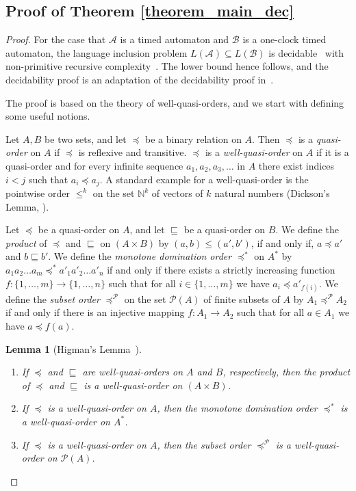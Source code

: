 \documentclass{CSML}
\theoremstyle{plain}\newtheorem{theorem}[thm]{Theorem}
\theoremstyle{plain}\newtheorem{corollary}[thm]{Corollary}
\theoremstyle{plain}\newtheorem{example}[thm]{Example}
\theoremstyle{plain}\newtheorem{lemma}[thm]{Lemma}
\theoremstyle{plain}\newtheorem{remark}[thm]{Remark}
\newcommand{\N}{\mathbb{N}}
\newcommand{\B}{\mathcal{B}}
\newcommand{\A}{\mathcal{A}}
\begin{document}
	\subsection{Proof of Theorem \ref{theorem_main_dec}}
	\begin{proof}
		For the case that $\A$ is a timed automaton and $\B$ is a one-clock timed automaton,
		the language inclusion problem $L(\A)\subseteq L(\B)$ is decidable~\cite{DBLP:conf/lics/OuaknineW04} with non-primitive recursive complexity~\cite{DBLP:journals/fuin/AbdullaDOQW08}. 
		The lower bound hence follows, and the decidability proof is an adaptation of the decidability proof in~\cite{DBLP:conf/lics/OuaknineW04}.


		
		The proof is based on the theory of well-quasi-orders, and we start with defining some useful notions.
	
	Let $A,B$ be two sets, and let $\preceq$ be a binary relation on $A$.
	Then $\preceq$ is a \emph{quasi-order} on $A$ if $\preceq$ is reflexive and transitive. 
	$\preceq$ is a \emph{well-quasi-order} on $A$ if it is a quasi-order and for every infinite sequence $a_1,a_2,a_3,\dots$ in $A$ there exist indices $i<j$ such that $a_i\preceq a_j$. 
	A standard example for a well-quasi-order is the pointwise order $\leq^k$ on the set $\N^k$ of vectors of $k$ natural numbers (Dickson's Lemma, \cite{Dickson1913}). 
	
	Let $\preceq$ be a quasi-order on $A$, 
	and let $\sqsubseteq$ be a quasi-order on $B$. 
	We define the \emph{product} of $\preceq$ and $\sqsubseteq$ on $(A\times B)$ by $(a,b)\leq (a',b')$, if and only if, $a\preceq a'$ and $b \sqsubseteq b'$. 	
	We define the \emph{monotone domination order} $\preceq^*$ on $A^*$ by $a_1 a_2 \dots a_m \preceq^* a'_1 a'_2\dots a'_n$ if and only if there exists a strictly increasing function ${f:\{1,\dots,m\}\to\{1,\dots,n\}}$ such that for all $i\in\{1,\dots,m\}$ we have $a_i\preceq a'_{f(i)}$. 
	We define the \emph{subset order} $\preceq^\mathcal{P}$ on the set $\mathcal{P}(A)$ of finite subsets of $A$ by
	$A_1\preceq^\mathcal{P} A_2$ if and only if there is an injective mapping $f:A_1\to A_2$ such that for all $a\in A_1$ we have $a\preceq f(a)$. 
	


	\begin{lemma}[Higman's Lemma~\cite{Higman1952}]
		\label{lemma_higman}
		\begin{enumerate}
		\item If $\preceq$ and $\sqsubseteq$ are well-quasi-orders on $A$ and $B$, respectively, 
			then the product of $\preceq$ and $\sqsubseteq$ is a well-quasi-order on $(A\times B)$. 
	\item  If $\preceq$ is a well-quasi-order on $A$,
		then the monotone domination order $\preceq^*$ is a well-quasi-order on $A^*$. 
	\item  If $\preceq$ is a well-quasi-order on $A$,
		then the subset order $\preceq^\mathcal{P}$ is a well-quasi-order on $\mathcal{P}(A)$. 
	\end{enumerate}
	\end{lemma}
		

\end{proof}
\end{document}
